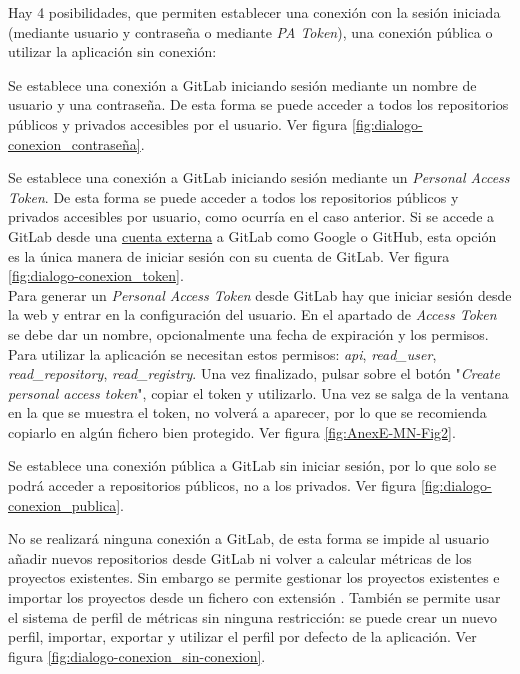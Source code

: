 Hay 4 posibilidades, que permiten establecer una conexión con la sesión iniciada (mediante usuario y contraseña o mediante \textit{PA Token}), una conexión pública o utilizar la aplicación sin conexión:
\begin{description}
	\tightlist
	\item[Iniciar sesión en GitLab mediante usuario y contraseña.] Se establece una conexión a GitLab iniciando sesión mediante un nombre de usuario y una contraseña. De esta forma se puede acceder a todos los repositorios públicos y privados accesibles por el usuario. Ver figura \ref{fig:dialogo-conexion_contraseña}.
	\item[Iniciar sesión en GitLab mediante \textit{Personal Access Token}.] Se establece una conexión a GitLab iniciando sesión mediante un \textit{Personal Access Token}. De esta forma se puede acceder a todos los repositorios públicos y privados accesibles por usuario, como ocurría en el caso anterior. 
	Si se accede a GitLab desde una \underline{cuenta externa} a GitLab como Google o GitHub, esta opción es la única manera de iniciar sesión con su cuenta de GitLab. Ver figura \ref{fig:dialogo-conexion_token}.\\
	Para generar un \textit{Personal Access Token} desde GitLab hay que iniciar sesión desde la web y entrar en la configuración del usuario. En el apartado de \textit{Access Token} se debe dar un nombre, opcionalmente una fecha de expiración y los permisos. Para utilizar la aplicación se necesitan estos permisos: \textit{api}, \textit{read\_user}, \textit{read\_repository}, \textit{read\_registry}. Una vez finalizado, pulsar sobre el botón "\textit{Create personal access token}", copiar el token y utilizarlo. Una vez se salga de la ventana en la que se muestra el token, no volverá a aparecer, por lo que se recomienda copiarlo en algún fichero bien protegido. Ver figura \ref{fig:AnexE-MN-Fig2}.
	\item[Usar una conexión pública hacia GitLab.] Se establece una conexión pública a GitLab sin iniciar sesión, por lo que solo se podrá acceder a repositorios públicos, no a los privados. Ver figura \ref{fig:dialogo-conexion_publica}.
	\item[No utilizar ninguna conexión.] No se realizará ninguna conexión a GitLab, de esta forma se impide al usuario añadir nuevos repositorios desde GitLab ni volver a calcular métricas de los proyectos existentes. Sin embargo se permite gestionar los proyectos existentes e importar los proyectos desde un fichero con extensión . También se permite usar el sistema de perfil de métricas sin ninguna restricción: se puede crear un nuevo perfil, importar, exportar y utilizar el perfil por defecto de la aplicación. Ver figura \ref{fig:dialogo-conexion_sin-conexion}.
\end{description}

